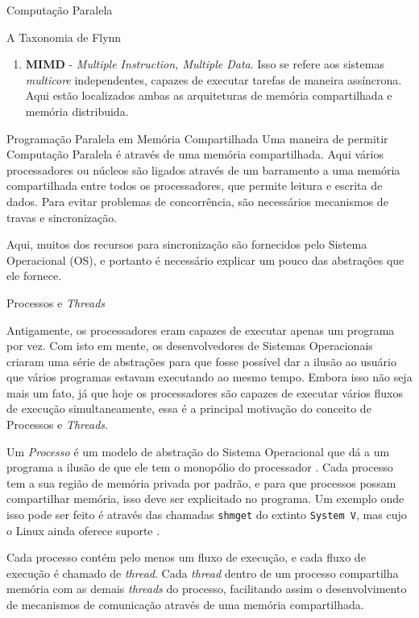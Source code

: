 \begin{section}{Computação Paralela}
\begin{subsection}{A Taxonomia de Flynn}
\begin{enumerate}
    \item \textbf{MIMD} - \textit{Multiple Instruction, Multiple Data}. Isso se refere
        aos sistemas \textit{multicore} independentes, capazes de executar tarefas
        de maneira assíncrona. Aqui estão localizados ambas as arquiteturas de memória
        compartilhada e memória distribuida.
\end{enumerate}
\end{subsection}

\begin{subsection}{Programação Paralela em Memória Compartilhada}
	Uma maneira de permitir Computação Paralela é através de
uma memória compartilhada. Aqui vários processadores ou núcleos
são ligados através de um barramento a uma memória compartilhada entre
todos os processadores, que permite leitura e escrita de dados.
Para evitar problemas de concorrência, são necessários mecanismos de
travas e sincronização.

	 Aqui, muitos dos recursos para sincronização são fornecidos pelo
Sistema Operacional (OS), e portanto é necessário explicar um pouco
das abstrações que ele fornece.

\begin{subsubsection}{Processos e \textit{Threads}}

	Antigamente, os processadores eram capazes de executar apenas
um programa por vez. Com isto em mente, os desenvolvedores
de Sistemas Operacionais criaram uma série de abstrações para que fosse
possível dar a ilusão ao usuário que vários programas estavam executando
ao mesmo tempo. Embora isso não seja mais um fato, já que hoje os processadores
são capazes de executar vários fluxos de execução simultaneamente, essa
é a principal motivação do conceito de Processos e \textit{Threads}.

	Um \textit{Processo} é um modelo de abstração do Sistema Operacional que
dá a um programa a ilusão de que ele tem o monopólio do processador
\citep{love:2005}. Cada processo tem a sua região de memória privada por
padrão, e para que processos possam compartilhar memória, isso deve ser 
explicitado no programa. Um exemplo onde isso pode ser feito é através das
chamadas \texttt{shmget} do extinto \texttt{System V}, mas cujo o Linux ainda
oferece suporte \citep{shmget}.

Cada processo contém pelo menos um fluxo de execução, e cada fluxo de
execução é chamado de \textit{thread}. Cada \textit{thread} dentro
de um processo compartilha memória com as demais \textit{threads}
do processo, facilitando assim o desenvolvimento de mecanismos de
comunicação através de uma memória compartilhada.


\end{subsubsection}
\end{subsection}
\end{section}

